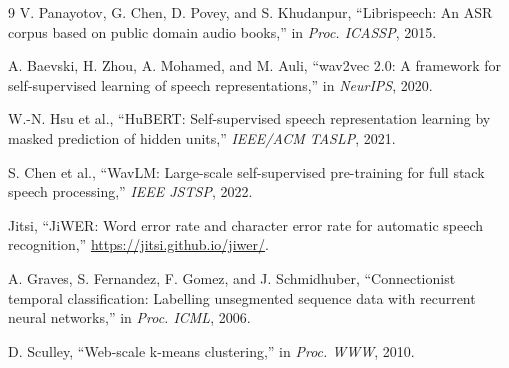 \documentclass{article}
\begin{document}
{\footnotesize
\begin{thebibliography}{9}
V. Panayotov, G. Chen, D. Povey, and S. Khudanpur, ``Librispeech: An ASR
corpus based on public domain audio books,'' in \emph{Proc. ICASSP}, 2015.

A. Baevski, H. Zhou, A. Mohamed, and M. Auli, ``wav2vec 2.0: A framework for
self-supervised learning of speech representations,'' in \emph{NeurIPS}, 2020.

W.-N. Hsu et al., ``HuBERT: Self-supervised speech representation learning by
masked prediction of hidden units,'' \emph{IEEE/ACM TASLP}, 2021.

S. Chen et al., ``WavLM: Large-scale self-supervised pre-training for full stack
speech processing,'' \emph{IEEE JSTSP}, 2022.

Jitsi, ``JiWER: Word error rate and character error rate for automatic speech
recognition,'' \url{https://jitsi.github.io/jiwer/}.

A. Graves, S. Fernandez, F. Gomez, and J. Schmidhuber, ``Connectionist temporal
classification: Labelling unsegmented sequence data with recurrent neural
networks,'' in \emph{Proc. ICML}, 2006.

D. Sculley, ``Web-scale k-means clustering,'' in \emph{Proc. WWW}, 2010.

\end{thebibliography}
}
\end{document}
